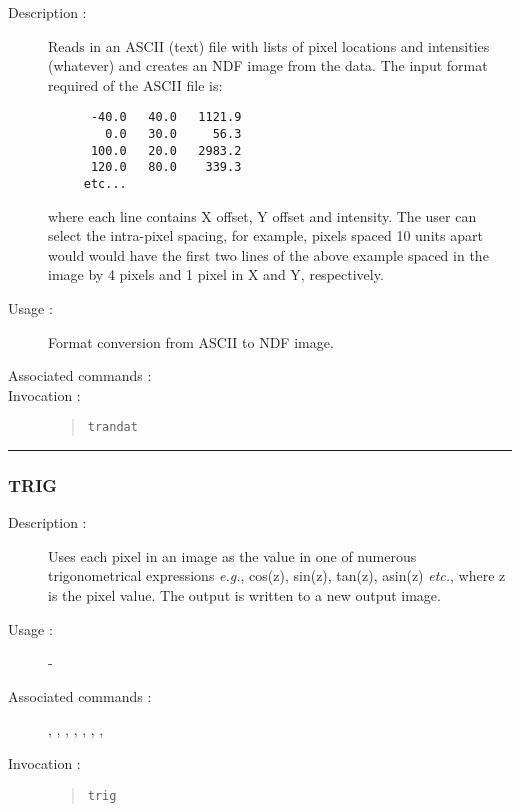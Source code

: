 \begin{description}

\item[Description :] Reads in an ASCII (text) file with lists of pixel
locations and intensities (whatever) and creates an NDF image from the
data.  The input format required of the ASCII file is:

\begin{small}
\begin{verbatim}
      -40.0   40.0   1121.9
        0.0   30.0     56.3
      100.0   20.0   2983.2
      120.0   80.0    339.3     
     etc...
\end{verbatim}
\end{small}

where each line contains X offset, Y offset and intensity.  The user
can select the intra-pixel spacing, for example, pixels spaced 10 units
apart would would have the first two lines of the above example spaced
in the image by 4 pixels and 1 pixel in X and Y, respectively.

\item[Usage :] Format conversion from ASCII to NDF image.
\item[Associated commands :] {\tt {}}
\item[Invocation :]

\begin{quote}{\tt  trandat }\end{quote}

\end{description}

\hrule 
\subsubsection*{\label{TRIG}TRIG}

\begin{description}

\item[Description :] Uses each pixel in an image as the value in one of
numerous trigonometrical expressions \emph{e.g.}, cos(z), sin(z),
tan(z), asin(z) \emph{etc.}, where z is the pixel value.  The output is
written to a new output image.

\item[Usage :] -

\item[Associated commands :] {\tt {}}, 
{\tt {}}, {\tt {}}, 
{\tt {}}, {\tt {}}, 
{\tt {}}, {\tt {}}, 
{\tt {}}

\item[Invocation :]

\begin{quote}{\tt  trig }\end{quote}

\end{description}

